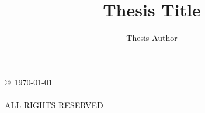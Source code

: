 \documentclass[12pt,oneside]{memoir}	%
\title{Thesis Title}
\author{Thesis Author}
\begin{document}
\dominitoc				%
\frontmatter			%
\begin{center}
\thispagestyle{empty}
\vspace*{3.5in}
\copyright~\copyyear\today\\[12pt]		%
\theauthor\\[12pt]					%
ALL RIGHTS RESERVED				%
\end{center}
%
\newpage
\vspace*{24pt}
\end{document}

